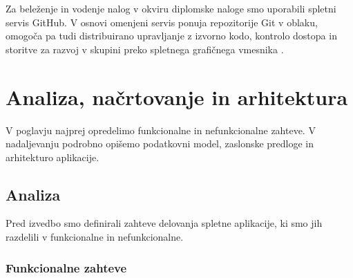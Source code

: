 \documentclass[a4paper, 12pt]{book}
\begin{document}
Za beleženje in vodenje nalog v okviru diplomske naloge smo uporabili spletni servis GitHub. V osnovi omenjeni servis ponuja repozitorije Git v oblaku, omogoča pa tudi distribuirano upravljanje z izvorno kodo, kontrolo dostopa in storitve za razvoj v skupini preko spletnega grafičnega vmesnika \cite{github}.



\chapter{Analiza, načrtovanje in arhitektura}
\label{analiza-nacrtovanje-arhitektura}

V poglavju najprej opredelimo funkcionalne in nefunkcionalne zahteve. V nadaljevanju podrobno opišemo podatkovni model, zaslonske predloge in arhitekturo aplikacije.


\section{Analiza}

Pred izvedbo smo definirali zahteve delovanja spletne aplikacije, ki smo jih razdelili v funkcionalne in nefunkcionalne.


\subsection{Funkcionalne zahteve}
\end{document}
